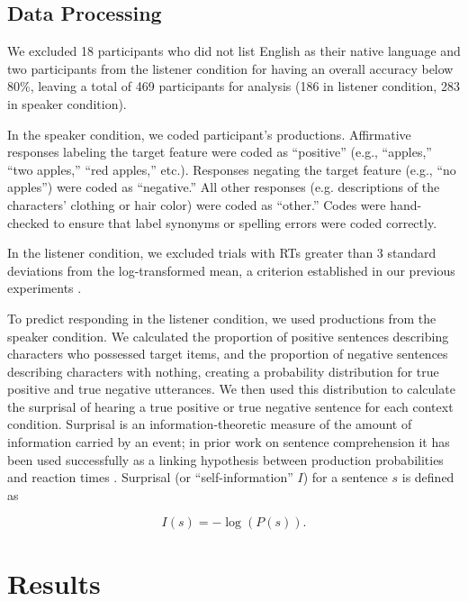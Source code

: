 \documentclass[man, noapacite]{apa2}
\begin{document}
\subsection{Data Processing} 
  
We excluded 18 participants who did not list English as their native language and two participants from the listener condition for having an overall accuracy below 80\%, leaving a total of 469 participants for analysis (186 in listener condition, 283 in speaker condition). 

In the speaker condition, we coded participant's productions. Affirmative responses labeling the target feature were coded as ``positive'' (e.g., ``apples,'' ``two apples,'' ``red apples,'' etc.).  Responses negating the target feature (e.g., ``no apples'') were coded as ``negative.''  All other responses (e.g. descriptions of the characters' clothing or hair color) were coded as ``other.''  Codes were hand-checked to ensure that label synonyms or spelling errors were coded correctly.

In the listener condition, we excluded trials with RTs greater than 3 standard deviations from the log-transformed mean, a criterion established in our previous experiments \cite{nordmeyer2014}.  

To predict responding in the listener condition, we used productions from the speaker condition. We calculated the proportion of positive sentences describing characters who possessed target items, and the proportion of negative sentences describing characters with nothing, creating a probability distribution for true positive and true negative utterances.  We then used this distribution to calculate the surprisal of hearing a true positive or true negative sentence for each context condition. Surprisal is an information-theoretic measure of the amount of information carried by an event; in prior work on sentence comprehension it has been used successfully as a linking hypothesis between production probabilities and reaction times \cite{levy2008}. Surprisal (or ``self-information'' $I$) for a sentence $s$ is defined as

\begin{equation}
\label{eq:surprise}
I(s) = -\log(P(s)).
\end{equation}

\section{Results}
\end{document}
